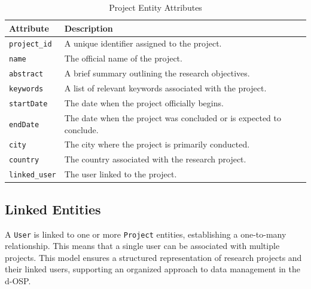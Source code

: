 \documentclass[final]{rc-book-2.14}
\begin{document}
\begin{table}[h]
    \centering
    \renewcommand{\arraystretch}{1.2}
    \caption{Project Entity Attributes}
    \label{tab:project_entity}
    \begin{tabularx}{\textwidth}{|l|X|}
        \hline
        \textbf{Attribute}    & \textbf{Description}                                                \\ \hline
        \texttt{project\_id}  & A unique identifier assigned to the project.                        \\ \hline
        \texttt{name}         & The official name of the project.                                   \\ \hline
        \texttt{abstract}     & A brief summary outlining the research objectives.                  \\ \hline
        \texttt{keywords}     & A list of relevant keywords associated with the project.            \\ \hline
        \texttt{startDate}    & The date when the project officially begins.                        \\ \hline
        \texttt{endDate}      & The date when the project was concluded or is expected to conclude. \\ \hline
        \texttt{city}         & The city where the project is primarily conducted.                  \\ \hline
        \texttt{country}      & The country associated with the research project.                   \\ \hline
        \texttt{linked\_user} & The user linked to the project.                                     \\ \hline
    \end{tabularx}
\end{table}


\subsection{Linked Entities}

A \texttt{User} is linked to one or more \texttt{Project} entities, establishing a one-to-many relationship. This means that a single user can be associated with multiple projects. This model ensures a structured representation of research projects and their linked users, supporting an organized approach to data management in the d-OSP.

\end{document}
